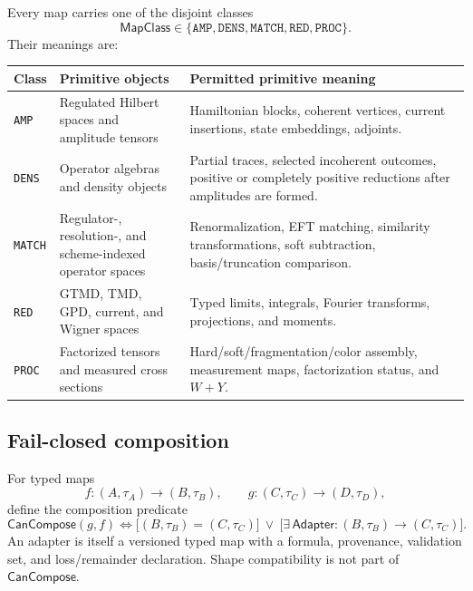 \documentclass[11pt]{article}
\begin{document}
Every map carries one of the disjoint classes
\begin{equation}
 \mathsf{MapClass}
 \in\{\texttt{AMP},\texttt{DENS},\texttt{MATCH},
 \texttt{RED},\texttt{PROC}\}.
\label{eq:map-class-enum}
\end{equation}
Their meanings are:
\begin{longtable}{L{0.14\textwidth}L{0.28\textwidth}L{0.49\textwidth}}
\toprule
Class & Primitive objects & Permitted primitive meaning\\
\midrule
\endhead
\texttt{AMP} & Regulated Hilbert spaces and amplitude tensors & Hamiltonian blocks, coherent vertices, current insertions, state embeddings, adjoints.\\
\texttt{DENS} & Operator algebras and density objects & Partial traces, selected incoherent outcomes, positive or completely positive reductions after amplitudes are formed.\\
\texttt{MATCH} & Regulator-, resolution-, and scheme-indexed operator spaces & Renormalization, EFT matching, similarity transformations, soft subtraction, basis/truncation comparison.\\
\texttt{RED} & GTMD, TMD, GPD, current, and Wigner spaces & Typed limits, integrals, Fourier transforms, projections, and moments.\\
\texttt{PROC} & Factorized tensors and measured cross sections & Hard/soft/fragmentation/color assembly, measurement maps, factorization status, and \(W+Y\).\\
\bottomrule
\end{longtable}

\subsection{Fail-closed composition}

For typed maps
\begin{equation}
 f:(A,\tau_A)\to(B,\tau_B),
 \qquad
 g:(C,\tau_C)\to(D,\tau_D),
\label{eq:typed-maps}
\end{equation}
define the composition predicate
\begin{equation}
 \mathsf{CanCompose}(g,f)
 \Longleftrightarrow
 \bigl[(B,\tau_B)=(C,\tau_C)\bigr]
 \ \lor\ 
 \bigl[\exists\,\mathsf{Adapter}: (B,\tau_B)\to(C,\tau_C)\bigr].
\label{eq:composition-predicate}
\end{equation}
An adapter is itself a versioned typed map with a formula, provenance,
validation set, and loss/remainder declaration.  Shape compatibility is not
part of \(\mathsf{CanCompose}\).
\end{document}
